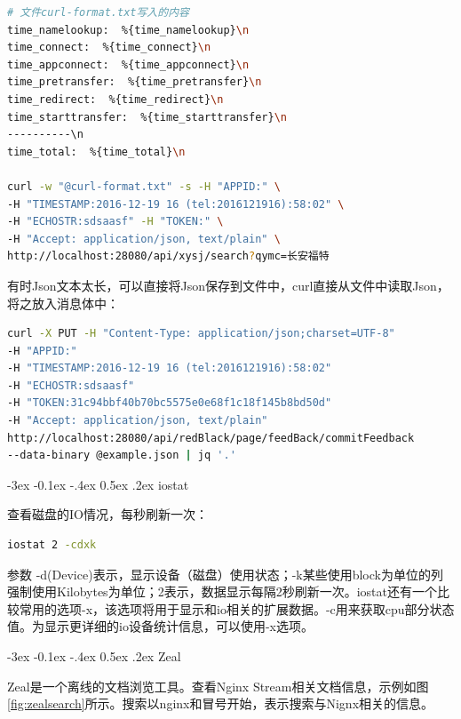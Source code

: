 \documentclass[12pt]{book}
\makeatletter
\numberwithin{dummy}{section}
\theoremstyle{ocrenumbox}
\theoremstyle{blacknumex}
\theoremstyle{blacknumbox}
\theoremstyle{ocrenum}
\renewcommand{\subsection}{\@startsection {subsection}{2}{\z@}
	{-3ex \@plus -0.1ex \@minus -.4ex}
	{0.5ex \@plus.2ex }
	{\normalfont\sffamily\bfseries}}
\makeatother
\begin{document}
\begin{lstlisting}[language=Bash]
# 文件curl-format.txt写入的内容
time_namelookup:  %{time_namelookup}\n
time_connect:  %{time_connect}\n
time_appconnect:  %{time_appconnect}\n
time_pretransfer:  %{time_pretransfer}\n
time_redirect:  %{time_redirect}\n
time_starttransfer:  %{time_starttransfer}\n
----------\n
time_total:  %{time_total}\n

curl -w "@curl-format.txt" -s -H "APPID:" \
-H "TIMESTAMP:2016-12-19 16 (tel:2016121916):58:02" \
-H "ECHOSTR:sdsaasf" -H "TOKEN:" \
-H "Accept: application/json, text/plain" \
http://localhost:28080/api/xysj/search?qymc=长安福特
\end{lstlisting}

有时Json文本太长，可以直接将Json保存到文件中，curl直接从文件中读取Json，将之放入消息体中：

\begin{lstlisting}[language=Bash]
curl -X PUT -H "Content-Type: application/json;charset=UTF-8" 
-H "APPID:"  
-H "TIMESTAMP:2016-12-19 16 (tel:2016121916):58:02"  
-H "ECHOSTR:sdsaasf" 
-H "TOKEN:31c94bbf40b70bc5575e0e68f1c18f145b8bd50d"  
-H "Accept: application/json, text/plain" 
http://localhost:28080/api/redBlack/page/feedBack/commitFeedback 
--data-binary @example.json | jq '.'
\end{lstlisting}




\subsection{iostat}

查看磁盘的IO情况，每秒刷新一次：

\begin{lstlisting}[language=Bash]
iostat 2 -cdxk
\end{lstlisting}

参数 -d(Device)表示，显示设备（磁盘）使用状态；-k某些使用block为单位的列强制使用Kilobytes为单位；2表示，数据显示每隔2秒刷新一次。iostat还有一个比较常用的选项-x，该选项将用于显示和io相关的扩展数据。-c用来获取cpu部分状态值。为显示更详细的io设备统计信息，可以使用-x选项。

\subsection{Zeal}

Zeal是一个离线的文档浏览工具。查看Nginx Stream相关文档信息，示例如图\ref{fig:zealsearch}所示。搜索以nginx和冒号开始，表示搜索与Nignx相关的信息。
\end{document}
